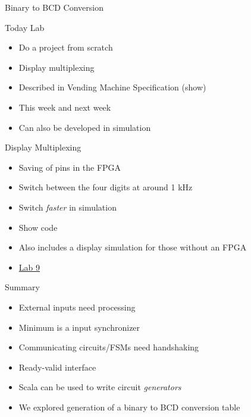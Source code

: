 \begin{frame}[fragile]{Binary to BCD Conversion}
\end{frame}

\begin{frame}[fragile]{Today Lab}
\begin{itemize}
\item Do a project from scratch
\item Display multiplexing
\item Described in Vending Machine Specification (show)
\item This week and next week
\item Can also be developed in simulation
\end{itemize}
\end{frame}

\begin{frame}[fragile]{Display Multiplexing}
\begin{itemize}
\item Saving of pins in the FPGA
\item Switch between the four digits at around 1 kHz
\item Switch \emph{faster} in simulation
\item Show code
\item Also includes a display simulation for those without an FPGA
\item \href{https://github.com/schoeberl/chisel-lab/tree/master/lab9}{Lab 9}
\end{itemize}
\end{frame}



\begin{frame}[fragile]{Summary}
\begin{itemize}
\item External inputs need processing
\item Minimum is a input synchronizer
\item Communicating circuits/FSMs need handshaking
\item Ready-valid interface
\item Scala can be used to write circuit \emph{generators}
\item We explored generation of a binary to BCD conversion table
\end{itemize}
\end{frame}





